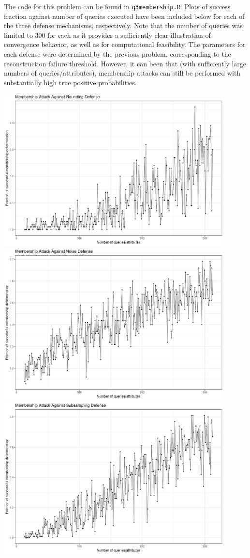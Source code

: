 \documentclass[12pt]{article}
\begin{document}
The code for this problem can be found in \texttt{q3membership.R}. Plots of success fraction against number of queries executed have been included below for each of the three defense mechanisms, respectively. Note that the number of queries was limited to 300 for each as it provides a sufficiently clear illustration of convergence behavior, as well as for computational feasibility. The parameters for each defense were determined by the previous problem, corresponding to the reconstruction failure threshold. However, it can been that (with sufficiently large numbers of queries/attributes), membership attacks can still be performed with substantially high true positive probabilities.
\begin{center}
	\includegraphics[width=0.9\textwidth]{figs/membershiprounding}
	\includegraphics[width=0.9\textwidth]{figs/membershipnoisy}
	\includegraphics[width=0.9\textwidth]{figs/membershipsubsampling}
\end{center}
\end{document}
